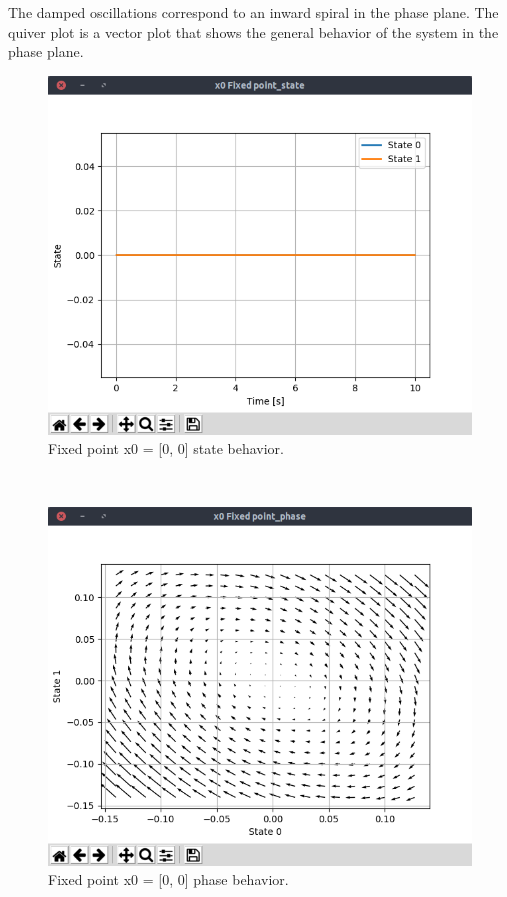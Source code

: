 \documentclass{cmc}
\begin{document}
The damped oscillations correspond to an inward spiral in the phase plane. The quiver plot is a vector plot that shows the general behavior of the system in the phase plane.

\begin{minipage}[t]{0.49\textwidth}
	\begin{figure}[H]
		\centering
  		\includegraphics[width=\textwidth,trim={0 1.25cm 0 0},clip]{figures/ex2_fixed_point_state.png}
  		\caption{Fixed point x0 = [0, 0] state behavior.}
  		\label{fig:ex2_fixed_point_state}
	\end{figure}
\end{minipage}
~
\begin{minipage}[t]{0.49\textwidth}
	\begin{figure}[H]
  		\centering
  		\includegraphics[width=\textwidth,trim={0 1.25cm 0 0},clip]{figures/ex2_fixed_point_phase.png}
  		\caption{Fixed point x0 = [0, 0] phase behavior.}
  		\label{fig:ex2_fixed_point_phase}
	\end{figure}
\end{minipage}
\end{document}
